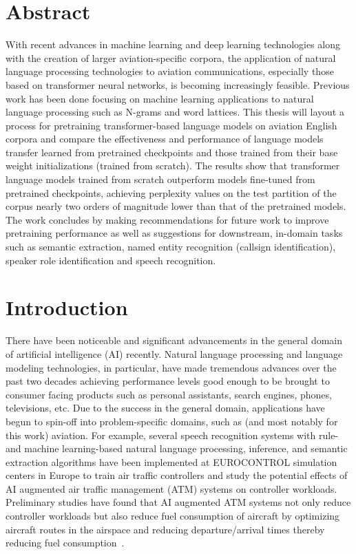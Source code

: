\documentclass[12pt]{article}
\begin{document}
\section{Abstract}\label{sec:abstract}
With recent advances in machine learning and deep learning technologies along with the creation of larger aviation-specific corpora, the application
of natural language processing technologies to aviation communications, especially those based on transformer neural networks, is becoming
increasingly feasible. Previous work has been done focusing on machine learning applications to natural language processing such as N-grams and word
lattices. This thesis will layout a process for pretraining transformer-based language models on aviation English corpora and compare the
effectiveness and performance of language models transfer learned from pretrained checkpoints and those trained from their base weight initializations
(trained from scratch). The results show that transformer language models trained from scratch outperform models fine-tuned from pretrained
checkpoints, achieving perplexity values on the test partition of the corpus nearly two orders of magnitude lower than that of the pretrained models.
The work concludes by making recommendations for future work to improve pretraining performance as well as suggestions for downstream, in-domain tasks
such as semantic extraction, named entity recognition (callsign identification), speaker role identification and speech recognition.

\section{Introduction}\label{sec:introduction}
There have been noticeable and significant advancements in the general domain of artificial intelligence (AI) recently. Natural language processing
and language modeling technologies, in particular, have made tremendous advances over the past two decades achieving performance levels good enough to
be brought to consumer facing products such as personal assistants, search engines, phones, televisions, etc. Due to the success in the general
domain, applications have begun to spin-off into problem-specific domains, such as (and most notably for this work) aviation. For example, several
speech recognition systems with rule- and machine learning-based natural language processing, inference, and semantic extraction algorithms have been
implemented at EUROCONTROL simulation centers in Europe to train air traffic controllers and study the potential effects of AI augmented air traffic
management (ATM) systems on controller workloads. Preliminary studies have found that AI augmented ATM systems not only reduce controller workloads
but also reduce fuel consumption of aircraft by optimizing aircraft routes in the airspace and reducing departure/arrival times thereby reducing fuel
consumption~\cite{helmke_quantifying_2017}.
\end{document}
